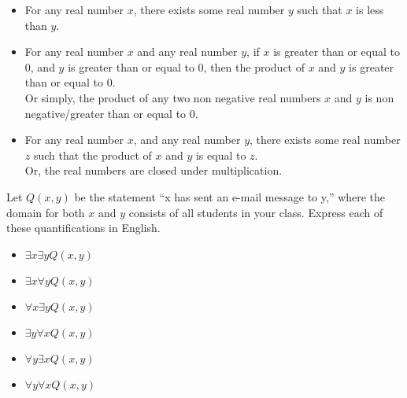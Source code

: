 \documentclass[addpoints]{exam}
\newenvironment{problem}[2][Problem]{\begin{trivlist}
    \item[\hskip \labelsep {\bfseries #1}\hskip \labelsep {\bfseries #2.}]}{\end{trivlist}}
\begin{document}
\begin{sloppypar}
\begin{questions}
    \question
    \begin{solution}
        \begin{itemize}
            \item[(a)] For any real number $x$, there exists some real number $y$ such that $x$ is less than $y$.
            \item[(b)] For any real number $x$ and any real number $y$, if $x$ is greater than or equal to 0, and $y$ is greater than or equal to 0, then the product of $x$ and $y$ is greater than or equal to 0. \\ Or simply, the product of any two non negative real numbers $x$ and $y$ is non negative/greater than or equal to 0.
            \item[(c)] For any real number $x$, and any real number $y$, there exists some real number $z$ such that the product of $x$ and $y$ is equal to $z$. \\ Or, the real numbers are closed under multiplication.  
        \end{itemize}
    \end{solution}
\end{questions}

\begin{problem}{15}
Let $Q(x,y)$ be the statement ``x has sent an e-mail message to y,'' where the domain for both $x$ and $y$ consists of all students in your class. Express each of these quantifications in English.
\begin{itemize}
    \item[(a)] $\exists x \exists y Q(x,y)$
    \item[(b)] $\exists x \forall y Q(x,y)$
    \item[(c)] $\forall x \exists y Q(x,y)$
    \item[(d)] $\exists y \forall x Q(x,y)$
    \item[(e)] $\forall y \exists x Q(x,y)$
    \item[(f)] $\forall y \forall x Q(x,y)$
\end{itemize}
\end{problem}


\end{sloppypar}
\end{document}
